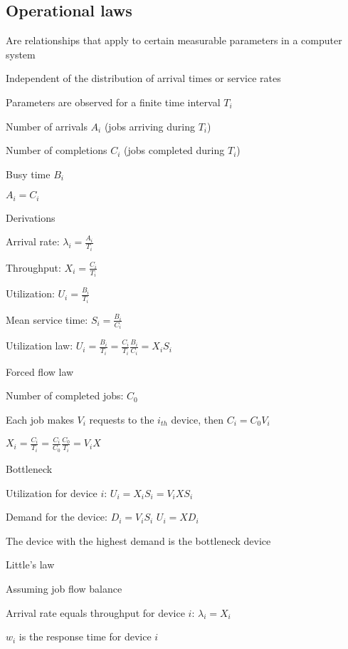 \subsection{Operational laws}
\enumstart
	\item Are relationships that apply to certain measurable parameters in a computer system
	\item Independent of the distribution of arrival times or service rates
	\item Parameters are observed for a finite time interval $T_i$
	\enumstart
		\item Number of arrivals $A_i$ (jobs arriving during $T_i$)
		\item Number of completions $C_i$ (jobs completed during $T_i$)
		\item Busy time $B_i$
		\item $A_i = C_i$
	\enumend
	\item Derivations
	\enumstart
		\item Arrival rate: $\lambda_i = \frac{A_i}{T_i}$
		\item Throughput: $X_i = \frac{C_i}{T_i}$
		\item Utilization: $U_i = \frac{B_i}{T_i}$
		\item Mean service time: $S_i = \frac{B_i}{C_i}$
	\enumend
	\item Utilization law: $U_i = \frac{B_i}{T_i} = \frac{C_i}{T_i} \frac{B_i}{C_i} = X_i S_i$
	\item Forced flow law
	\enumstart
		\item Number of completed jobs: $C_0$
		\item Each job makes $V_i$ requests to the $i_{th}$ device, then $C_i = C_0V_i$
		\item $X_i = \frac{C_i}{T_i} = \frac{C_i}{C_0} \frac{C_0}{T_i} = V_iX$
	\enumend
	\item Bottleneck
	\enumstart
		\item Utilization for device $i$: $U_i = X_iS_i = V_iXS_i$
		\item Demand for the device: $D_i = V_iS_i$ \arrow $U_i = XD_i$
		\item The device with the highest demand is the bottleneck device
	\enumend
	\item Little's law
	\enumstart
		\item Assuming job flow balance
		\item Arrival rate equals throughput for device $i$: $\lambda_i = X_i$
		\item $w_i$ is the response time for device $i$
